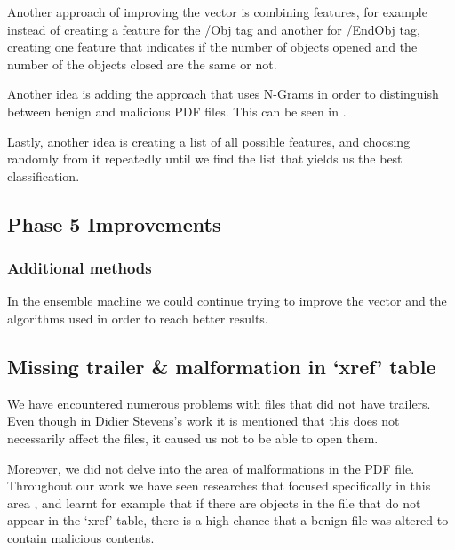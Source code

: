 \documentclass{article}
\begin{document}
\indent Another approach of improving the vector is combining features, for example instead of creating a feature for the /Obj tag and another for /EndObj tag, creating one feature that indicates if the number of objects opened and the number of the objects closed are the same or not.

\indent Another idea is adding the approach that uses N-Grams in order to distinguish between benign and malicious PDF files. This can be seen in \cite{Joachims1999Thorsten}.

\indent Lastly, another idea is creating a list of all possible features, and choosing randomly from it repeatedly until we find the list that yields us the best classification.

\subsection{Phase 5 Improvements}
\subsubsection{Additional methods}
\indent In the ensemble machine we could continue trying to improve the vector and the algorithms used in order to reach better results.

\subsection{Missing trailer \& malformation in ‘xref’ table}
\indent We have encountered numerous problems with files that did not have trailers. Even though in Didier Stevens’s work \cite{1} it is mentioned that this does not necessarily affect the files, it caused us not to be able to open them.

\indent Moreover, we did not delve into the area of malformations in the PDF file. Throughout our work we have seen researches that focused specifically in this area \cite{torres2018malicious} \cite{OtsuboChecker}, and learnt for example that if there are objects in the file that do not appear in the ‘xref’ table, there is a high chance that a benign file was altered to contain malicious contents.


\medskip
 
\end{document}

